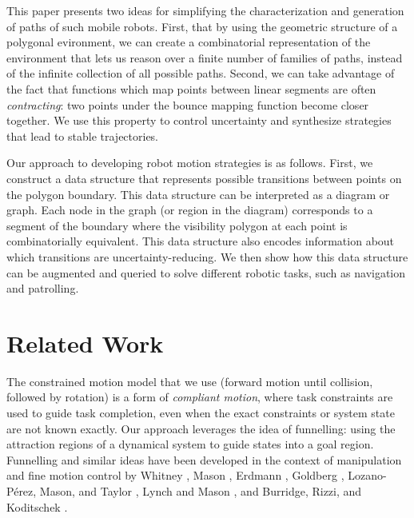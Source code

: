 \documentclass[]{styles/svproc}  %
\begin{document}
This paper presents two ideas for simplifying the characterization and
generation of paths of such mobile robots.  First, that by using the geometric
structure of a polygonal evironment, we can create a combinatorial
representation of the environment that lets us reason over a finite number of
families of paths, instead of the infinite collection of all possible paths.
Second, we can take advantage of the fact that functions which map points
between linear segments are often \emph{contracting}: two points under the
bounce mapping function become closer together.  We use this property to
control uncertainty and synthesize strategies that lead to stable trajectories.

Our approach to developing robot motion strategies is as follows.
First, we construct a data structure that represents possible transitions between points on
the polygon boundary. This data structure can be interpreted as a diagram or graph. 
Each node in the graph (or region in the diagram) corresponds to a segment of the
boundary where the visibility polygon at each point is combinatorially equivalent.  This data structure also encodes information about which transitions are 
uncertainty-reducing.  We then show how this data structure can be augmented and queried to solve different robotic tasks, such as navigation and patrolling.




\section{Related Work}

The constrained motion model that we use (forward motion until collision,
followed by rotation) is a
form of \emph{compliant motion}, where task constraints are used to guide task
completion, even when the exact constraints or system state are not known
exactly. Our approach leverages the idea of funnelling: using
the attraction regions of a dynamical system to guide states into a goal region.
Funnelling and similar ideas have been developed in the context of manipulation and fine motion control by Whitney
\cite{Whi77}, Mason \cite{Mas85}, Erdmann
\cite{Erd86}, Goldberg \cite{Gol93}, Lozano-P{\'e}rez, Mason, and Taylor
\cite{LozMasTay84}, Lynch and Mason \cite{LynMas95}, and Burridge, Rizzi, and Koditschek \cite{BurRizKod99}.
\end{document}
